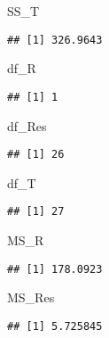 \documentclass[
]{article}
\newenvironment{Shaded}{\begin{snugshade}}{\end{snugshade}}
\newcommand{\NormalTok}[1]{#1}
\begin{document}
\begin{Shaded}
\begin{Highlighting}[]
\NormalTok{SS\_T}
\end{Highlighting}
\end{Shaded}

\begin{verbatim}
## [1] 326.9643
\end{verbatim}

\begin{Shaded}
\begin{Highlighting}[]
\NormalTok{df\_R}
\end{Highlighting}
\end{Shaded}

\begin{verbatim}
## [1] 1
\end{verbatim}

\begin{Shaded}
\begin{Highlighting}[]
\NormalTok{df\_Res}
\end{Highlighting}
\end{Shaded}

\begin{verbatim}
## [1] 26
\end{verbatim}

\begin{Shaded}
\begin{Highlighting}[]
\NormalTok{df\_T}
\end{Highlighting}
\end{Shaded}

\begin{verbatim}
## [1] 27
\end{verbatim}

\begin{Shaded}
\begin{Highlighting}[]
\NormalTok{MS\_R}
\end{Highlighting}
\end{Shaded}

\begin{verbatim}
## [1] 178.0923
\end{verbatim}

\begin{Shaded}
\begin{Highlighting}[]
\NormalTok{MS\_Res}
\end{Highlighting}
\end{Shaded}

\begin{verbatim}
## [1] 5.725845
\end{verbatim}
\end{document}
